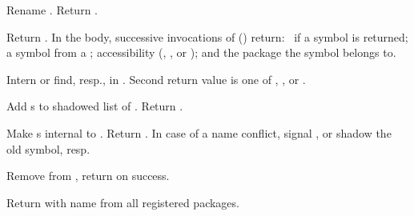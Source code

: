\begin{LIST}{1cm}
  Rename . Return .

  Return . In the body, successive
  invocations of  () return: \T\ if a symbol is returned;
  a symbol from a ; accessibility
  (, , or ); and the
  package the symbol belongs to.

  Intern or find, resp.,  in . Second return value is 
  one of , , or
  . 

  Add s to shadowed list of . Return \retval{\T}.
  
  Make s internal  to . Return \retval{\T}. In
  case of a name conflict, signal , or shadow
  the old symbol, resp.

  Remove  from , return \retval{\T} on success.

  Return  with name  from all
  registered packages.

\end{LIST}


